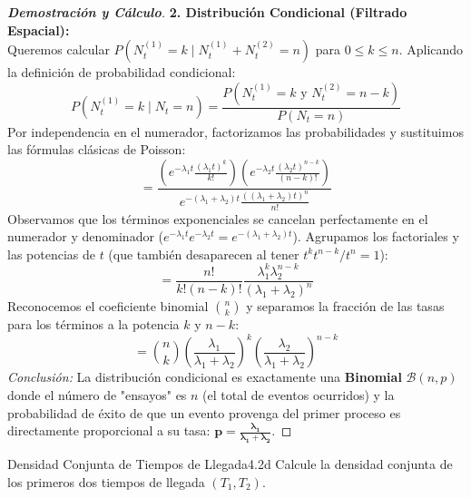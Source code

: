 \documentclass[10pt,a4paper]{article}
\begin{document}
\begin{proof}[\textbf{Demostración y Cálculo}]
    \vspace{3mm}
    \textbf{2. Distribución Condicional (Filtrado Espacial):} \\
    Queremos calcular $P(N_t^{(1)} = k \mid N_t^{(1)} + N_t^{(2)} = n)$ para $0 \le k \le n$.
    Aplicando la definición de probabilidad condicional:
    \[ P(N_t^{(1)} = k \mid N_t = n) = \frac{P(N_t^{(1)} = k \text{ y } N_t^{(2)} = n-k)}{P(N_t = n)} \]
    Por independencia en el numerador, factorizamos las probabilidades y sustituimos las fórmulas clásicas de Poisson:
    \[ = \frac{ \left( e^{-\lambda_1 t} \frac{(\lambda_1 t)^k}{k!} \right) \left( e^{-\lambda_2 t} \frac{(\lambda_2 t)^{n-k}}{(n-k)!} \right) }{ e^{-(\lambda_1+\lambda_2)t} \frac{((\lambda_1+\lambda_2)t)^n}{n!} } \]
    Observamos que los términos exponenciales se cancelan perfectamente en el numerador y denominador ($e^{-\lambda_1 t}e^{-\lambda_2 t} = e^{-(\lambda_1+\lambda_2)t}$). Agrupamos los factoriales y las potencias de $t$ (que también desaparecen al tener $t^k t^{n-k} / t^n = 1$):
    \[ = \frac{n!}{k!(n-k)!} \frac{\lambda_1^k \lambda_2^{n-k}}{(\lambda_1+\lambda_2)^n} \]
    Reconocemos el coeficiente binomial $\binom{n}{k}$ y separamos la fracción de las tasas para los términos a la potencia $k$ y $n-k$:
    \[ = \binom{n}{k} \left(\frac{\lambda_1}{\lambda_1+\lambda_2}\right)^k \left(\frac{\lambda_2}{\lambda_1+\lambda_2}\right)^{n-k} \]
    \textit{Conclusión:} La distribución condicional es exactamente una \textbf{Binomial} $\mathcal{B}(n, p)$ donde el número de "ensayos" es $n$ (el total de eventos ocurridos) y la probabilidad de éxito de que un evento provenga del primer proceso es directamente proporcional a su tasa: $\mathbf{p = \frac{\lambda_1}{\lambda_1+\lambda_2}}$.
\end{proof}

\newpage

\begin{ejercicio}{Densidad Conjunta de Tiempos de Llegada}{4.2d}
    Calcule la densidad conjunta de los primeros dos tiempos de llegada $(T_1, T_2)$.
\end{ejercicio}
\end{document}
